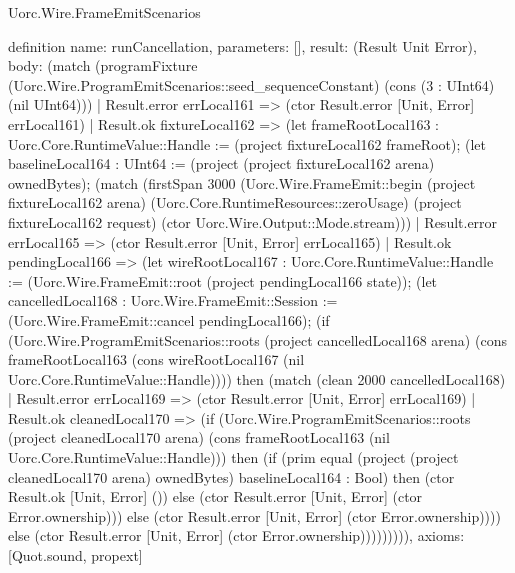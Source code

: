 \begin{lexlean}{Uorc.Wire.FrameEmitScenarios}
\begin{semanticmodule}
definition{
  name: runCancellation,
  parameters: [],
  result: (Result Unit Error),
  body: (match (programFixture (Uorc.Wire.ProgramEmitScenarios::seed_sequenceConstant) (cons (3 : UInt64) (nil UInt64)))
    | Result.error errLocal161 => (ctor Result.error [Unit, Error] errLocal161)
    | Result.ok fixtureLocal162 => (let frameRootLocal163 : Uorc.Core.RuntimeValue::Handle := (project fixtureLocal162 frameRoot); (let baselineLocal164 : UInt64 := (project (project fixtureLocal162 arena) ownedBytes); (match (firstSpan 3000 (Uorc.Wire.FrameEmit::begin (project fixtureLocal162 arena) (Uorc.Core.RuntimeResources::zeroUsage) (project fixtureLocal162 request) (ctor Uorc.Wire.Output::Mode.stream)))
      | Result.error errLocal165 => (ctor Result.error [Unit, Error] errLocal165)
      | Result.ok pendingLocal166 => (let wireRootLocal167 : Uorc.Core.RuntimeValue::Handle := (Uorc.Wire.FrameEmit::root (project pendingLocal166 state)); (let cancelledLocal168 : Uorc.Wire.FrameEmit::Session := (Uorc.Wire.FrameEmit::cancel pendingLocal166); (if (Uorc.Wire.ProgramEmitScenarios::roots (project cancelledLocal168 arena) (cons frameRootLocal163 (cons wireRootLocal167 (nil Uorc.Core.RuntimeValue::Handle)))) then (match (clean 2000 cancelledLocal168)
        | Result.error errLocal169 => (ctor Result.error [Unit, Error] errLocal169)
        | Result.ok cleanedLocal170 => (if (Uorc.Wire.ProgramEmitScenarios::roots (project cleanedLocal170 arena) (cons frameRootLocal163 (nil Uorc.Core.RuntimeValue::Handle))) then (if (prim equal (project (project cleanedLocal170 arena) ownedBytes) baselineLocal164 : Bool) then (ctor Result.ok [Unit, Error] ()) else (ctor Result.error [Unit, Error] (ctor Error.ownership))) else (ctor Result.error [Unit, Error] (ctor Error.ownership)))) else (ctor Result.error [Unit, Error] (ctor Error.ownership))))))))),
  axioms: [Quot.sound, propext]
}


\end{semanticmodule}
\end{lexlean}
